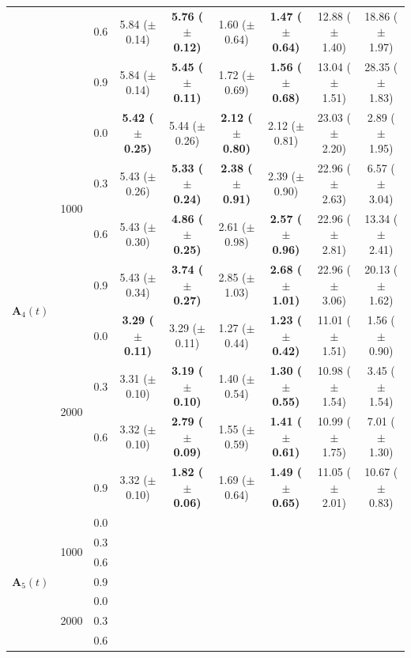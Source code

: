 \begin{table}[htbp]
{\begin{tabular}{lll|cc|cc|cc}
 &  & 0.6 & 5.84 ($\pm$ 0.14) & \textbf{5.76 ($\pm$ 0.12)} & 1.60 ($\pm$ 0.64) & \textbf{1.47 ($\pm$ 0.64)} & 12.88 ($\pm$ 1.40) & 18.86 ($\pm$ 1.97) \\
 &  & 0.9 & 5.84 ($\pm$ 0.14) & \textbf{5.45 ($\pm$ 0.11)} & 1.72 ($\pm$ 0.69) & \textbf{1.56 ($\pm$ 0.68)} & 13.04 ($\pm$ 1.51) & 28.35 ($\pm$ 1.83) \\
\hline
\multirow{8}{*}{$\mathbf{A}_4(t)$} & \multirow{4}{*}{1000} & 0.0 & \textbf{5.42 ($\pm$ 0.25)} & 5.44 ($\pm$ 0.26) & \textbf{2.12 ($\pm$ 0.80)} & 2.12 ($\pm$ 0.81) & 23.03 ($\pm$ 2.20) & 2.89 ($\pm$ 1.95) \\
 &  & 0.3 & 5.43 ($\pm$ 0.26) & \textbf{5.33 ($\pm$ 0.24)} & \textbf{2.38 ($\pm$ 0.91)} & 2.39 ($\pm$ 0.90) & 22.96 ($\pm$ 2.63) & 6.57 ($\pm$ 3.04) \\
 &  & 0.6 & 5.43 ($\pm$ 0.30) & \textbf{4.86 ($\pm$ 0.25)} & 2.61 ($\pm$ 0.98) & \textbf{2.57 ($\pm$ 0.96)} & 22.96 ($\pm$ 2.81) & 13.34 ($\pm$ 2.41) \\
 &  & 0.9 & 5.43 ($\pm$ 0.34) & \textbf{3.74 ($\pm$ 0.27)} & 2.85 ($\pm$ 1.03) & \textbf{2.68 ($\pm$ 1.01)} & 22.96 ($\pm$ 3.06) & 20.13 ($\pm$ 1.62) \\
\cline{2-9}
 & \multirow{4}{*}{2000} & 0.0 & \textbf{3.29 ($\pm$ 0.11)} & 3.29 ($\pm$ 0.11) & 1.27 ($\pm$ 0.44) & \textbf{1.23 ($\pm$ 0.42)} & 11.01 ($\pm$ 1.51) & 1.56 ($\pm$ 0.90) \\
 &  & 0.3 & 3.31 ($\pm$ 0.10) & \textbf{3.19 ($\pm$ 0.10)} & 1.40 ($\pm$ 0.54) & \textbf{1.30 ($\pm$ 0.55)} & 10.98 ($\pm$ 1.54) & 3.45 ($\pm$ 1.54) \\
 &  & 0.6 & 3.32 ($\pm$ 0.10) & \textbf{2.79 ($\pm$ 0.09)} & 1.55 ($\pm$ 0.59) & \textbf{1.41 ($\pm$ 0.61)} & 10.99 ($\pm$ 1.75) & 7.01 ($\pm$ 1.30) \\
 &  & 0.9 & 3.32 ($\pm$ 0.10) & \textbf{1.82 ($\pm$ 0.06)} & 1.69 ($\pm$ 0.64) & \textbf{1.49 ($\pm$ 0.65)} & 11.05 ($\pm$ 2.01) & 10.67 ($\pm$ 0.83) \\
\hline
\multirow{8}{*}{$\mathbf{A}_5(t)$} & \multirow{4}{*}{1000} & 0.0 &  &  &  &  &  &  \\
 &  & 0.3 &  &  &  &  &  &  \\
 &  & 0.6 &  &  &  &  &  &  \\
 &  & 0.9 &  &  &  &  &  &  \\
\cline{2-9}
 & \multirow{4}{*}{2000} & 0.0 &  &  &  &  &  &  \\
 &  & 0.3 &  &  &  &  &  &  \\
 &  & 0.6 &  &  &  &  &  &  \\

\end{tabular}}
\end{table}

